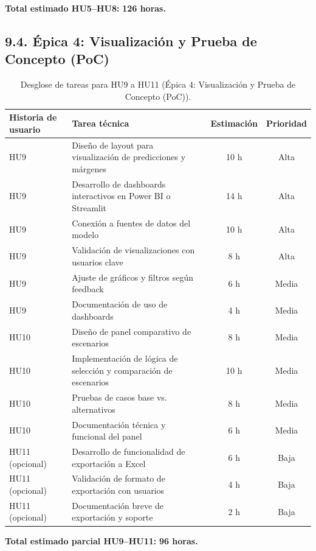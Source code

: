 \documentclass[
11pt, %
]{charter}
\begin{document}
\vspace{0.5cm}
\noindent
\textbf{Total estimado HU5–HU8:} \textbf{126 horas.}

\subsection*{9.4. Épica 4: Visualización y Prueba de Concepto (PoC)}

\begin{table}[H]
\centering
\begin{tabular}{|l|p{6cm}|c|c|}
\hline
\textbf{Historia de usuario} & \textbf{Tarea técnica} & \textbf{Estimación} & \textbf{Prioridad} \\
\hline
HU9 & Diseño de layout para visualización de predicciones y márgenes & 10 h & Alta \\
HU9 & Desarrollo de dashboards interactivos en Power BI o Streamlit & 14 h & Alta \\
HU9 & Conexión a fuentes de datos del modelo & 10 h & Alta \\
HU9 & Validación de visualizaciones con usuarios clave & 8 h & Alta \\
HU9 & Ajuste de gráficos y filtros según feedback & 6 h & Media \\
HU9 & Documentación de uso de dashboards & 4 h & Media \\
\hline
HU10 & Diseño de panel comparativo de escenarios & 8 h & Media \\
HU10 & Implementación de lógica de selección y comparación de escenarios & 10 h & Media \\
HU10 & Pruebas de casos base vs. alternativos & 8 h & Media \\
HU10 & Documentación técnica y funcional del panel & 6 h & Media \\
\hline
HU11 (opcional) & Desarrollo de funcionalidad de exportación a Excel & 6 h & Baja \\
HU11 (opcional) & Validación de formato de exportación con usuarios & 4 h & Baja \\
HU11 (opcional) & Documentación breve de exportación y soporte & 2 h & Baja \\
\hline
\end{tabular}
\caption{Desglose de tareas para HU9 a HU11 (Épica 4: Visualización y Prueba de Concepto (PoC)).}
\end{table}

\vspace{0.5cm}
\noindent
\textbf{Total estimado parcial HU9–HU11:} \textbf{96 horas.}
\end{document}
